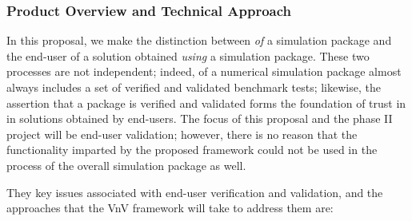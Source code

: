 \subsubsection{Product Overview and Technical Approach}

In this proposal, we make the distinction between \VV \emph{of} a simulation package and the end-user \VV of a solution obtained \emph{using} a simulation package. These two processes are not independent; indeed, \VV of a numerical simulation 
package almost always includes a set of verified and validated benchmark tests; likewise, the assertion that a package is verified and validated forms the foundation of trust in in solutions obtained by end-users. The focus of this proposal and the phase II project will be end-user validation; however, there is no reason that the functionality imparted by the proposed framework could not be used in the \VV process of the overall simulation package as well. 

They key issues associated with end-user verification and validation, and the approaches that the VnV framework will take to address them are:

